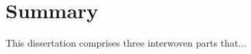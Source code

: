 \section{Summary}
\label{sec:conclusion:summary}

This dissertation comprises three interwoven parts that...
